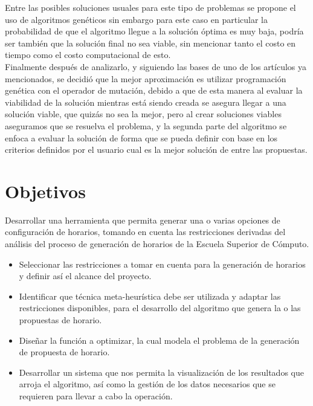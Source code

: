 	Entre las posibles soluciones usuales para este tipo de problemas se propone el uso de algoritmos genéticos sin embargo para este caso en particular la probabilidad de que el algoritmo llegue a la solución óptima es muy baja, podría ser también que la solución final no sea viable, sin mencionar tanto el costo en tiempo como el costo computacional de esto.\\
	
	Finalmente después de analizarlo, y siguiendo las bases de uno de los artículos ya mencionados, se decidió que la mejor aproximación es utilizar programación genética con el operador de mutación, debido a que de esta manera al evaluar la viabilidad de la solución mientras está siendo creada se asegura llegar a una solución viable, que quizás no sea la mejor, pero al crear soluciones viables aseguramos que se resuelva el problema, y la segunda parte del algoritmo se enfoca a evaluar la solución de forma que se pueda definir con base en los criterios definidos por el usuario cual es la mejor solución de entre las propuestas.\\

\section{Objetivos}
	Desarrollar una herramienta que permita generar una o varias opciones de configuración de horarios, tomando en cuenta las restricciones derivadas del análisis del proceso de generación de horarios de la Escuela Superior de Cómputo.
	
	\begin{itemize}
		\item Seleccionar las restricciones a tomar en cuenta para la generación de horarios y definir así el alcance del proyecto.
		
		\item Identificar que técnica meta-heurística debe ser utilizada y adaptar las restricciones disponibles, para el  desarrollo del algoritmo que genera la o las propuestas de horario. 
		
		\item Diseñar la función a optimizar, la cual modela el problema de la generación de propuesta de horario.
	
		\item Desarrollar un sistema que nos permita la visualización de los resultados que arroja el algoritmo, así como la gestión de los datos necesarios que se requieren para llevar a cabo la operación.
		
	\end{itemize}
	

